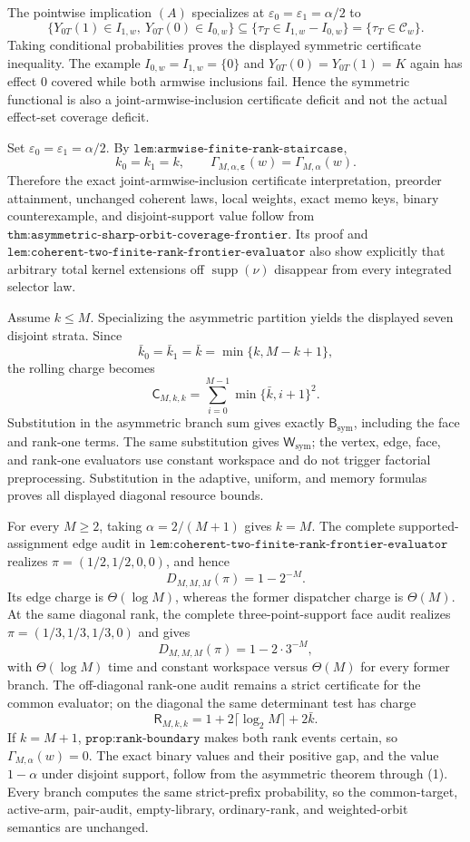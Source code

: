 The pointwise implication \((A)\) specializes at
\(\varepsilon_0=\varepsilon_1=\alpha/2\) to
\[
\{Y_{0T}(1)\in I_{1,w},\ Y_{0T}(0)\in I_{0,w}\}
\subseteq
\{\tau_T\in I_{1,w}-I_{0,w}\}
=
\{\tau_T\in\mathcal C_w\}.
\tag{S0}
\]
Taking conditional probabilities proves the displayed symmetric certificate inequality. The example
\(I_{0,w}=I_{1,w}=\{0\}\) and
\(Y_{0T}(0)=Y_{0T}(1)=K\) again has effect \(0\) covered while both armwise inclusions fail. Hence the symmetric functional is also a joint-armwise-inclusion certificate deficit and not the actual effect-set coverage deficit.

Set \(\varepsilon_0=\varepsilon_1=\alpha/2\). By \(\texttt{lem:armwise-finite-rank-staircase}\),
\[
k_0=k_1=k,\qquad
\Gamma_{M,\alpha,\boldsymbol\varepsilon}(w)=\Gamma_{M,\alpha}(w).
\tag{1}
\]
Therefore the exact joint-armwise-inclusion certificate interpretation, preorder attainment, unchanged coherent laws, local weights, exact memo keys, binary counterexample, and disjoint-support value follow from \(\texttt{thm:asymmetric-sharp-orbit-coverage-frontier}\). Its proof and \(\texttt{lem:coherent-two-finite-rank-frontier-evaluator}\) also show explicitly that arbitrary total kernel extensions off \(\operatorname{supp}(\nu)\) disappear from every integrated selector law.

Assume \(k\le M\). Specializing the asymmetric partition yields the displayed seven disjoint strata. Since
\[
\bar k_0=\bar k_1=\bar k=\min\{k,M-k+1\},
\]
the rolling charge becomes
\[
\mathsf C_{M,k,k}=\sum_{i=0}^{M-1}\min\{\bar k,i+1\}^2.
\]
Substitution in the asymmetric branch sum gives exactly \(\mathsf B_{\mathrm{sym}}\), including the face and rank-one terms. The same substitution gives \(\mathsf W_{\mathrm{sym}}\); the vertex, edge, face, and rank-one evaluators use constant workspace and do not trigger factorial preprocessing. Substitution in the adaptive, uniform, and memory formulas proves all displayed diagonal resource bounds.

For every \(M\ge2\), taking \(\alpha=2/(M+1)\) gives \(k=M\). The complete supported-assignment edge audit in \(\texttt{lem:coherent-two-finite-rank-frontier-evaluator}\) realizes \(\pi=(1/2,1/2,0,0)\), and hence
\[
D_{M,M,M}(\pi)=1-2^{-M}.
\]
Its edge charge is \(\Theta(\log M)\), whereas the former dispatcher charge is \(\Theta(M)\). At the same diagonal rank, the complete three-point-support face audit realizes \(\pi=(1/3,1/3,1/3,0)\) and gives
\[
D_{M,M,M}(\pi)=1-2\cdot3^{-M},
\]
with \(\Theta(\log M)\) time and constant workspace versus \(\Theta(M)\) for every former branch. The off-diagonal rank-one audit remains a strict certificate for the common evaluator; on the diagonal the same determinant test has charge
\[
\mathsf R_{M,k,k}=1+2\lceil\log_2M\rceil+2\bar k.
\]
If \(k=M+1\), \(\texttt{prop:rank-boundary}\) makes both rank events certain, so \(\Gamma_{M,\alpha}(w)=0\). The exact binary values and their positive gap, and the value \(1-\alpha\) under disjoint support, follow from the asymmetric theorem through (1). Every branch computes the same strict-prefix probability, so the common-target, active-arm, pair-audit, empty-library, ordinary-rank, and weighted-orbit semantics are unchanged.